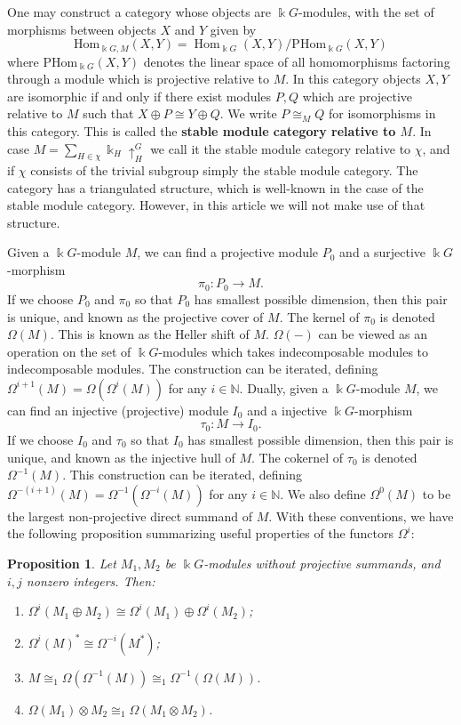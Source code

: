 \documentclass[a4paper]{amsart}
\newcommand{\kk}{\Bbbk}
\def\Hom{\operatorname{Hom}}
\def\N{\mathbb{N}}
\newtheorem{Proposition}[Lemma]{Proposition}
\theoremstyle{definition}
\theoremstyle{remark}
\theoremstyle{Acknowledgments}
\begin{document}
One may construct a category whose objects are $\kk G$-modules, with the set of morphisms between objects $X$ and $Y$ given by
\[\mathrm{Hom}_{\kk G, M}(X,Y) = \Hom_{\kk G}(X,Y)/\mathrm{PHom}_{\kk G}(X,Y)\] where $\mathrm{PHom}_{\kk G}(X,Y)$ denotes the linear space of all homomorphisms factoring through a module which is projective relative to $M$. In this category objects $X, Y$ are isomorphic if and only if there exist modules $P, Q$ which are projective relative to $M$ such that $X \oplus P \cong Y \oplus Q$. We write $P \cong_M Q$ for isomorphisms in this category. This is called the {\bf stable module category relative to $M$}. In case $M = \sum_{H \in \chi} \kk_H \uparrow^G_H$ we call it the stable module category relative to $\chi$, and if $\chi$ consists of the trivial subgroup simply the stable module category. The category has a triangulated structure, which is well-known in the case of the stable module category. However, in this article we will not make use of that structure.

Given a $\kk G$-module $M$, we can find a projective module $P_0$ and a surjective $\kk G$-morphism
\[\pi_0: P_0 \rightarrow M.\]
If we choose $P_0$ and $\pi_0$ so that $P_0$ has smallest possible dimension, then this pair is unique, and known as the projective cover of $M$. The kernel of $\pi_0$ is denoted $\Omega(M).$ This is known as the Heller shift of $M$. $\Omega(-)$ can be viewed as an operation on the set of $\kk G$-modules which takes indecomposable modules to indecomposable modules. The construction can be iterated, defining $\Omega^{i+1}(M) = \Omega(\Omega^{i}(M))$ for any $i \in \N$. Dually, 
given a $\kk G$-module $M$, we can find an injective (projective) module $I_0$ and a injective $\kk G$-morphism
\[\tau_0: M \rightarrow I_0.\]
If we choose $I_0$ and $\tau_0$ so that $I_0$ has smallest possible dimension, then this pair is unique, and known as the injective hull of $M$. The cokernel of $\tau_0$ is denoted $\Omega^{-1}(M).$ This construction can be iterated, defining $\Omega^{-(i+1)}(M) = \Omega^{-1}(\Omega^{-i}(M))$ for any $i \in \N$.
We also define $\Omega^0(M)$ to be the largest non-projective direct summand of $M$. With these conventions, we have the following proposition summarizing useful properties of the functors $\Omega^i$:

\begin{Proposition}\label{omegaomnibus} Let $M_1, M_2$ be $\kk G$-modules without projective summands, and $i, j$ nonzero integers. Then:

\begin{enumerate}
\item[(i)] $\Omega^i(M_1 \oplus M_2) \cong \Omega^i(M_1) \oplus \Omega^i(M_2)$;
\item[(ii)] $\Omega^i(M)^* \cong \Omega^{-i}(M^*)$;
\item[(iii)] $M \cong_{1} \Omega(\Omega^{-1}(M))  \cong_{1}  \Omega^{-1}(\Omega(M))$.
\item[(iv)] $\Omega(M_1) \otimes M_2 \cong_{1} \Omega(M_1 \otimes M_2)$.
\end{enumerate}
\end{Proposition}
\end{document}
